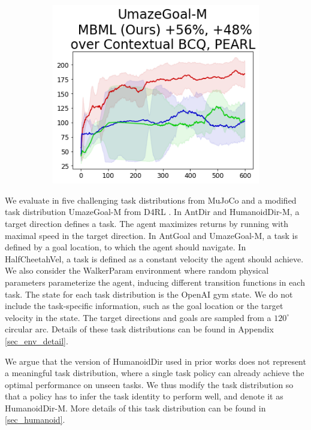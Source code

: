 \begin{figure}[!t]
\begin{minipage}{0.69\textwidth}
{            \begin{subfigure}{\mujocobaselinefigsize\paperwidth}
                \includegraphics[width=\linewidth]{chapter_2/fig/wd-UmazeGoal-M.png}
            \end{subfigure}}

    \end{minipage}
\end{figure}

We evaluate in five challenging task distributions from MuJoCo \cite{todorov2012mujoco} and a modified task distribution UmazeGoal-M from D4RL \cite{fu2020d4rl}. In AntDir and HumanoidDir-M, a target direction defines a task. The agent maximizes returns by running with maximal speed in the target direction. In AntGoal and UmazeGoal-M, a task is defined by a goal location, to which the agent should navigate. In HalfCheetahVel, a task is defined as a constant velocity the agent should achieve. We also consider the WalkerParam environment where random physical parameters parameterize the agent, inducing different transition functions in each task. The state for each task distribution is the OpenAI gym state. We do not include the task-specific information, such as the goal location or the target velocity in the state. The target directions and goals are sampled from a $120^{\circ}$ circular arc. Details of these task distributions can be found in Appendix \ref{sec_env_detail}.

We argue that the version of HumanoidDir used in prior works does not represent a meaningful task distribution, where a single task policy can already achieve the optimal performance on unseen tasks. We thus modify the task distribution so that a policy has to infer the task identity to perform well, and denote it as HumanoidDir-M. More details of this task distribution can be found in \autoref{sec_humanoid}.


